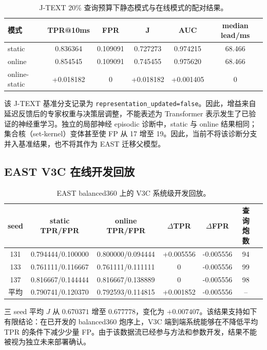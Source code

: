 \documentclass[11pt,a4paper]{article}
\newcommand{\code}[1]{\texttt{\small #1}}
\begin{document}
\begin{table}[H]
\centering
\caption{J-TEXT 20\% 查询预算下静态模式与在线模式的配对结果。}
\begin{tabular}{l c c c c c}
\toprule
模式 & TPR@10ms & FPR & J & AUC & median lead/ms\\
\midrule
static & 0.836364 & 0.109091 & 0.727273 & 0.974215 & 68.466\\
online & 0.854545 & 0.109091 & 0.745455 & 0.975620 & 68.466\\
\midrule
online-static & +0.018182 & 0 & +0.018182 & +0.001405 & 0\\
\bottomrule
\end{tabular}
\end{table}

该 J-TEXT 基准分支记录为 \code{representation\_updated=false}。因此，增益来自延迟反馈后的专家权重与决策层调整，不能表述为 Transformer 表示发生了已验证的神经重学习。独立的局部神经 episodic 诊断中，static 与 online 结果相同；集合核（set-kernel）变体甚至使 FP 从 17 增至 19。因此，当前不将该诊断分支并入基准结果，也不将其作为 EAST 迁移父模型。

\subsection{EAST V3C 在线开发回放}

\begin{table}[H]
\centering
\caption{EAST balanced360 上的 V3C 系统级开发回放。}
\begin{tabular}{c c c c c c c}
\toprule
seed & static TPR/FPR & online TPR/FPR & \(\Delta\)TPR & \(\Delta\)FPR & 查询炮数\\
\midrule
131 & 0.794444/0.100000 & 0.800000/0.094444 & +0.005556 & -0.005556 & 94\\
133 & 0.761111/0.116667 & 0.761111/0.111111 & 0 & -0.005556 & 99\\
137 & 0.816667/0.144444 & 0.816667/0.138889 & 0 & -0.005556 & 98\\
\midrule
平均 & 0.790741/0.120370 & 0.792593/0.114815 & +0.001852 & -0.005556 & --\\
\bottomrule
\end{tabular}
\end{table}

三 seed 平均 \(J\) 从 \(0.670371\) 增至 \(0.677778\)，变化为 \(+0.007407\)。该结果支持如下有限结论：在已开发的 balanced360 炮序上，V3C 端到端系统能够在不降低平均 TPR 的条件下减少少量 FP。由于该数据流已经参与方法和参数开发，结果不能被视为独立未来部署确认。
\end{document}
